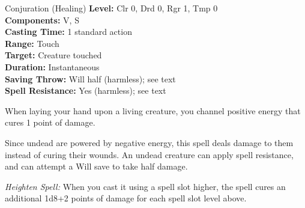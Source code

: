 {Conjuration (Healing)}
{
	\textbf{Level:}
	Clr 0, Drd 0, Rgr 1, Tmp 0\\
	\textbf{Components:}
	V, S\\
	\textbf{Casting Time:}
	1 standard action\\
	\textbf{Range:}
	Touch\\
	\textbf{Target:}
	Creature touched\\
	\textbf{Duration:}
	Instantaneous\\
	\textbf{Saving Throw:}
	Will half (harmless); see text\\
	\textbf{Spell Resistance:}
	Yes (harmless); see text\\
}
{
	When laying your hand upon a living creature, you channel positive energy that cures 1 point of damage.

	Since undead are powered by negative energy, this spell deals damage to them instead of curing their wounds. An undead creature can apply spell resistance, and can attempt a Will save to take half damage.

	\textit{Heighten Spell:} When you cast it using a spell slot higher, the spell cures an additional 1d8+2 points of damage for each spell slot level above.
}
